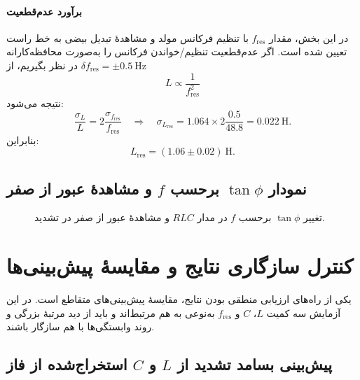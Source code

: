 \documentclass[a4paper, 11pt]{article}
\begin{document}
\paragraph{برآورد عدم‌قطعیت}
در این بخش، مقدار \(f_{\mathrm{res}}\) با تنظیم فرکانس مولد و مشاهدهٔ تبدیل بیضی به خط راست تعیین شده است. اگر عدم‌قطعیت تنظیم/خواندن فرکانس را به‌صورت محافظه‌کارانه \(\delta f_{\mathrm{res}}=\pm 0.5~\mathrm{Hz}\) در نظر بگیریم، از
\[
L\propto \frac{1}{f_{\mathrm{res}}^2}
\]
نتیجه می‌شود:
\[
\frac{\sigma_L}{L}=2\frac{\sigma_{f_{\mathrm{res}}}}{f_{\mathrm{res}}}
\quad\Rightarrow\quad
\sigma_{L_{\mathrm{res}}}=1.064\times 2\frac{0.5}{48.8}=0.022\ \mathrm{H}.
\]
بنابراین:
\[
\boxed{L_{\mathrm{res}}=(1.06\pm 0.02)\ \mathrm{H}.}
\]

\subsection{نمودار \(\tan\phi\) برحسب \(f\) و مشاهدهٔ عبور از صفر}

\begin{figure}[h!]
\centering
{}
\caption{تغییر \(\tan\phi\) برحسب \(f\) در مدار $RLC$ و مشاهدهٔ عبور از صفر در تشدید.}
\label{fig:tan_f_RLC}
\end{figure}


\section{کنترل سازگاری نتایج و مقایسهٔ پیش‌بینی‌ها}

یکی از راه‌های ارزیابی منطقی بودن نتایج، مقایسهٔ پیش‌بینی‌های متقاطع است. در این آزمایش سه کمیت \(L\)، \(C\) و \(f_{\mathrm{res}}\) به‌نوعی به هم مرتبط‌اند و باید از دید مرتبهٔ بزرگی و روند وابستگی‌ها با هم سازگار باشند.

\subsection{پیش‌بینی بسامد تشدید از \(L\) و \(C\) استخراج‌شده از فاز}
\end{document}
